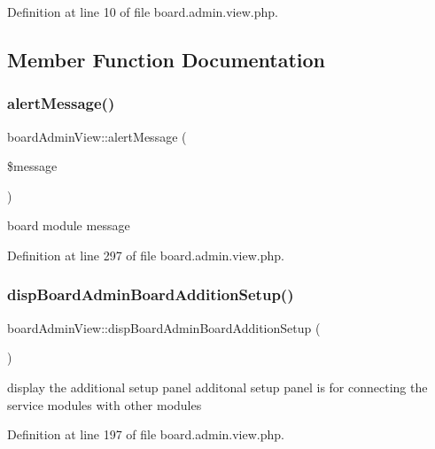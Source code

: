Definition at line 10 of file board.\+admin.\+view.\+php.



\subsection{Member Function Documentation}
\mbox{\label{classboardAdminView_ad999a21f3d2a33b2d503fb8cb7ecdd53}} 
\subsubsection{\texorpdfstring{alert\+Message()}{alertMessage()}}
{\footnotesize\ttfamily board\+Admin\+View\+::alert\+Message (\begin{DoxyParamCaption}\item[{}]{\$message }\end{DoxyParamCaption})}



board module message 



Definition at line 297 of file board.\+admin.\+view.\+php.

\mbox{\label{classboardAdminView_a684dcfc8eba6453f2de80730f32f364f}} 
\subsubsection{\texorpdfstring{disp\+Board\+Admin\+Board\+Addition\+Setup()}{dispBoardAdminBoardAdditionSetup()}}
{\footnotesize\ttfamily board\+Admin\+View\+::disp\+Board\+Admin\+Board\+Addition\+Setup (\begin{DoxyParamCaption}{ }\end{DoxyParamCaption})}



display the additional setup panel additonal setup panel is for connecting the service modules with other modules 



Definition at line 197 of file board.\+admin.\+view.\+php.

